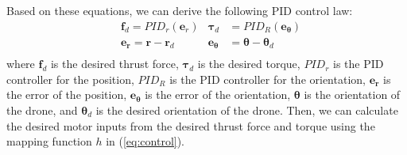 Based on these equations, we can derive the following PID control law:
\begin{equation}
  \begin{aligned}
    &\bm{f}_d = {PID}_r(\bm{e}_r)
    &\bm{\tau}_d &= {PID}_R(\bm{e_\theta})\\
    &\bm{e_r} = \bm{r} - \bm{r}_d
    &\bm{e_\theta} &= \bm{\theta} - \bm{\theta}_d\\
  \end{aligned}
\end{equation}
where $\bm{f}_d$ is the desired thrust force, 
$\bm{\tau}_d$ is the desired torque, 
$PID_r$ is the PID controller for the position, 
$PID_R$ is the PID controller for the orientation, 
$\bm{e_r}$ is the error of the position, 
$\bm{e_\theta}$ is the error of the orientation, 
$\bm{\theta}$ is the orientation of the drone, 
and $\bm{\theta}_d$ is the desired orientation of the drone.
Then, we can calculate the desired motor inputs from the desired thrust force and torque using the mapping function $h$ in (\ref{eq:control}).
